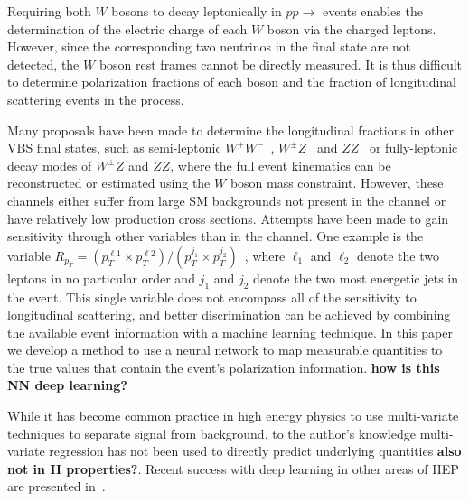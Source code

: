 Requiring both $W$ bosons to decay leptonically in  $pp
\to$ \ssWW events enables the determination of the electric charge of
each $W$ boson via the charged leptons. However, since the
corresponding two neutrinos in the final state are not detected, the
$W$ boson rest frames cannot be directly measured.  It is thus
difficult to determine polarization fractions of each boson and
the fraction of longitudinal scattering events in the \ssWW process.

Many proposals have been made to determine the longitudinal fractions in other VBS final states, such as semi-leptonic
$W^+W^-$~\cite{Han:2009em}, $W^\pm Z$~\cite{aa} and $ZZ$~\cite{le houche report} or
fully-leptonic decay modes of $W^\pm Z$ and $ZZ$, where the full
event kinematics can be reconstructed or estimated using the $W$ boson mass constraint. 
However, these channels either suffer from large SM backgrounds not present in the \ssWW channel or
have relatively low production cross sections. Attempts have been made
to gain sensitivity through other variables than \ts in the \ssWW
channel. One example is the variable $R_{p_T}=(p_{T}^{\ell 1} \times
p_{T}^{\ell 2}) / (p_T^{j_1} \times p_T^{j_2})$~\cite{Doroba:2012pd},
where $\ell_1$ and $\ell_2$ denote the two leptons in no particular
order and $j_1$ and $j_2$ denote the two most energetic jets in the
event. This single variable does not encompass all of the
sensitivity to longitudinal scattering, and better discrimination can
be achieved by combining the available event information with a
machine learning technique. In this paper we develop a method to use a
neural network to map measurable quantities to the true \cts values
that contain the event's polarization information. {\bf how is this NN deep learning?}
 

While it has become common practice in high energy physics to use
multi-variate techniques to separate signal from background, to the
author's knowledge multi-variate regression has not been used to
directly predict underlying quantities {\bf also not in H
  properties?}.  Recent success with deep learning in other areas of
HEP are presented in~\cite{Baldi:2014kfa,Baldi:2014pta}.

